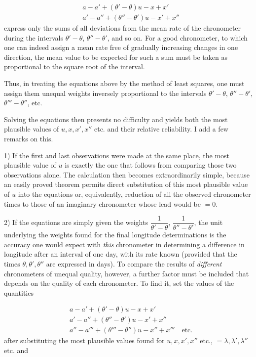 \[
\begin{aligned}
&a-a'+(\theta'-\theta)u-x+x'\\
&a'-a''+(\theta''-\theta')u-x'+x''
\end{aligned}
\]
\noindent express only the sums of all deviations from the mean rate of the chronometer during the intervals $\theta'-\theta$, $\theta''-\theta'$, and so on. For a good chronometer, to which one can indeed assign a mean rate free of gradually increasing changes in one direction, the mean value to be expected for such a sum must be taken as proportional to the square root of the interval.

Thus, in treating the equations above by the method of least squares, one must assign them unequal weights inversely proportional to the intervals $\theta'-\theta$, $\theta''-\theta'$, $\theta'''-\theta''$, etc.

Solving the equations then presents no difficulty and yields both the most plausible values of $u, x, x', x''$ etc. and their relative reliability. I add a few remarks on this.

1) If the first and last observations were made at the same place, the most plausible value of $u$ is exactly the one that follows from comparing those two observations alone. The calculation then becomes extraordinarily simple, because an easily proved theorem permits direct substitution of this most plausible value of $u$ into the equations or, equivalently, reduction of all the observed chronometer times to those of an imaginary chronometer whose lead would be $=0$.

2) If the equations are simply given the weights $\dfrac{1}{\theta'-\theta}$, $\dfrac{1}{\theta''-\theta'}$, the unit underlying the weights found for the final longitude determinations is the accuracy one would expect with \emph{this} chronometer in determining a difference in longitude after an interval of one day, with its rate known (provided that the times $\theta, \theta', \theta''$ are expressed in days). To compare the results of \emph{different} chronometers of unequal quality, however, a further factor must be included that depends on the quality of each chronometer. To find it, set the values of the quantities

\[
\begin{aligned}
&a-a'+(\theta'-\theta)u-x+x'\\
&a'-a''+(\theta''-\theta')u-x'+x''\\
&a''-a'''+(\theta'''-\theta'')u-x''+x''' \quad \text{etc.}
\end{aligned}
\]
\noindent after substituting the most plausible values found for $u, x, x', x''$ etc., $=\lambda, \lambda', \lambda''$ etc. and

